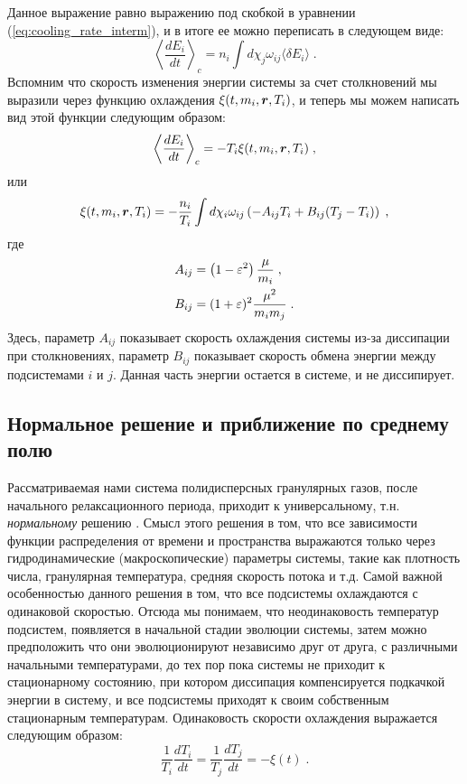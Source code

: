 Данное выражение равно выражению под скобкой в уравнении (\ref{eq:cooling_rate_interm}), и в итоге ее можно переписать в
следующем виде:
\begin{equation}
  \left\langle\frac{dE_i}{dt}\right\rangle_c = n_i\int d\chi_j\omega_{ij}\langle\delta E_i\rangle\;.
\end{equation} 
Вспомним что скорость изменения энергии системы за счет столкновений мы выразили через функцию охлаждения $\xi(t,m_i,\bm{r},T_i)$, 
и теперь мы можем написать вид этой функции следующим образом:
\begin{equation}
  \left\langle\frac{dE_i}{dt}\right\rangle_c = -T_i\xi(t,m_i,\bm{r},T_i)\;,
\end{equation} 
или
\begin{equation}\label{eq:cooling_term}
  \xi(t,m_i,\bm{r},T_i)=-\frac{n_i}{T_i}\int d\chi_i\omega_{ij}\left(-A_{ij}T_i+B_{ij}(T_j-T_i)\right)\;,
\end{equation}
где
\begin{equation}
  \begin{split}
    A_{ij} &= \left(1-\varepsilon^2\right)\frac{\mu}{m_i}\;,\\
    B_{ij} &= (1+\varepsilon)^2\frac{\mu^2}{m_im_j}\;.
  \end{split}
\end{equation}
Здесь, параметр $A_{ij}$ показывает скорость охлаждения системы из-за диссипации при столкновениях, 
параметр $B_{ij}$ показывает скорость обмена энергии между подсистемами $i$ и $j$. Данная часть энергии
остается в системе, и не диссипирует.

\subsection{Нормальное решение и приближение по среднему полю}
Рассматриваемая нами система полидисперсных гранулярных газов, после начального релаксационного периода, приходит 
к универсальному, т.н. \emph{нормальному} решению \cite{Garzo:2007pre_enskog_I}. Смысл этого решения в том, что все зависимости функции
распределения от времени и пространства выражаются только через гидродинамические (макроскопические) параметры системы, 
такие как плотность числа, гранулярная температура, средняя скорость потока и т.д. Самой важной особенностью данного решения
в том, что все подсистемы охлаждаются с одинаковой скоростью. Отсюда мы понимаем, что неодинаковость температур подсистем,
появляется в начальной стадии эволюции системы, затем можно предположить что они эволюционируют независимо друг от друга,
с различными начальными температурами, до тех пор пока системы не приходит к стационарному состоянию, при котором диссипация
компенсируется подкачкой энергии в систему, и все подсистемы приходят к своим собственным стационарным температурам.
Одинаковость скорости охлаждения выражается следующим образом:
\begin{equation}
  \frac{1}{T_i}\frac{dT_i}{dt}=\frac{1}{T_j}\frac{dT_j}{dt}=-\xi(t)\;.
\end{equation}

